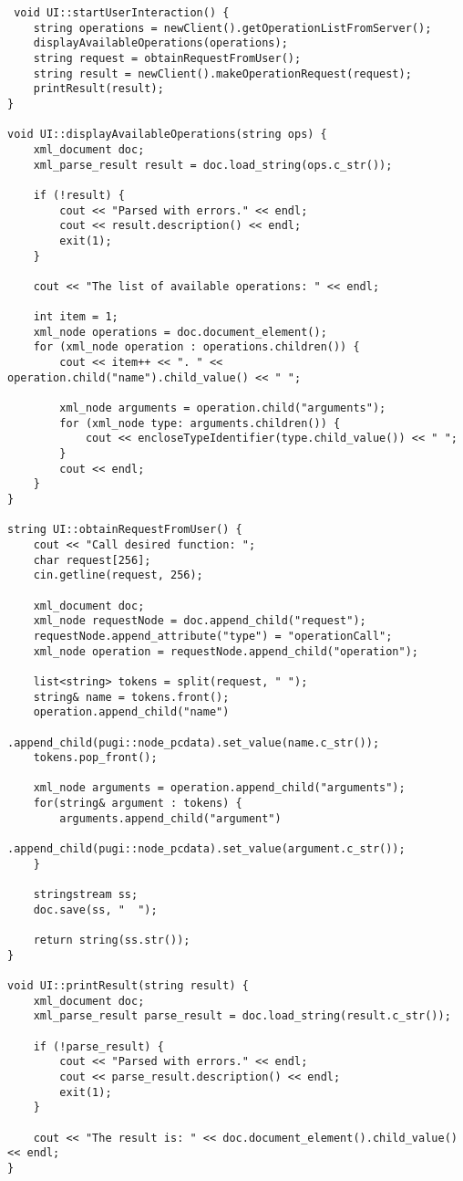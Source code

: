 \documentclass{llncs}
\begin{document}

 \begin{lstlisting}
 void UI::startUserInteraction() {
    string operations = newClient().getOperationListFromServer();
    displayAvailableOperations(operations);
    string request = obtainRequestFromUser();
    string result = newClient().makeOperationRequest(request);
    printResult(result);
}

void UI::displayAvailableOperations(string ops) {
    xml_document doc;
    xml_parse_result result = doc.load_string(ops.c_str());

    if (!result) {
        cout << "Parsed with errors." << endl;
        cout << result.description() << endl;
        exit(1);
    }

    cout << "The list of available operations: " << endl;

    int item = 1;
    xml_node operations = doc.document_element();
    for (xml_node operation : operations.children()) {
        cout << item++ << ". " << operation.child("name").child_value() << " ";

        xml_node arguments = operation.child("arguments");
        for (xml_node type: arguments.children()) {
            cout << encloseTypeIdentifier(type.child_value()) << " ";
        }
        cout << endl;
    }
}

string UI::obtainRequestFromUser() {
    cout << "Call desired function: ";
    char request[256];
    cin.getline(request, 256);

    xml_document doc;
    xml_node requestNode = doc.append_child("request");
    requestNode.append_attribute("type") = "operationCall";
    xml_node operation = requestNode.append_child("operation");

    list<string> tokens = split(request, " ");
    string& name = tokens.front();
    operation.append_child("name")
    			.append_child(pugi::node_pcdata).set_value(name.c_str());
    tokens.pop_front();

    xml_node arguments = operation.append_child("arguments");
    for(string& argument : tokens) {
        arguments.append_child("argument")
        	.append_child(pugi::node_pcdata).set_value(argument.c_str());
    }

    stringstream ss;
    doc.save(ss, "  ");

    return string(ss.str());
}

void UI::printResult(string result) {
    xml_document doc;
    xml_parse_result parse_result = doc.load_string(result.c_str());

    if (!parse_result) {
        cout << "Parsed with errors." << endl;
        cout << parse_result.description() << endl;
        exit(1);
    }

    cout << "The result is: " << doc.document_element().child_value() << endl;
}
\end{lstlisting}
\end{document}
